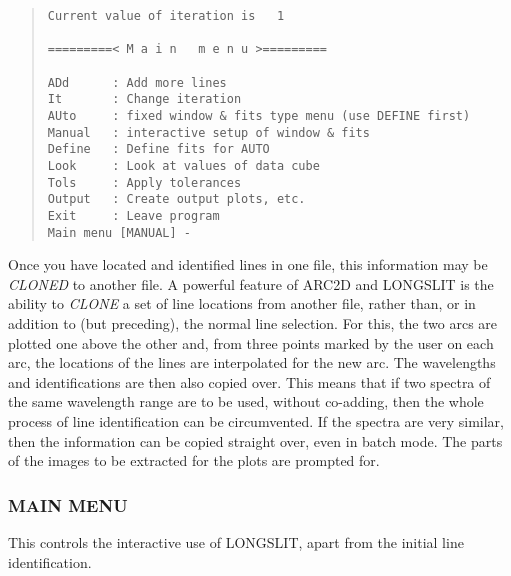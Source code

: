 \begin{quote}\begin{verbatim}
Current value of iteration is   1
 
=========< M a i n   m e n u >=========
 
ADd      : Add more lines
It       : Change iteration
AUto     : fixed window & fits type menu (use DEFINE first)
Manual   : interactive setup of window & fits
Define   : Define fits for AUTO
Look     : Look at values of data cube
Tols     : Apply tolerances
Output   : Create output plots, etc.
Exit     : Leave program
Main menu [MANUAL] -
\end{verbatim}\end{quote}

Once you have located and identified lines in one file, this information
may be {\em CLONED} to another file.
A powerful feature of ARC2D and LONGSLIT
is the ability to {\em CLONE} a set of line locations from another
file, rather than, or in addition to (but preceding), the normal line
selection. For this, the two arcs are plotted one above the other
and, from three points marked by the user on each
arc, the locations of the lines are interpolated for the new arc. The
wavelengths and identifications are then also copied over. This means
that if two spectra of the same wavelength range are to be used,
without co-adding, then the whole process of line identification can be
circumvented. If the spectra are very similar, then the information can
be copied straight over, even in batch mode.
The parts of the images to be extracted for the plots are prompted for.

\subsubsection{MAIN MENU}
\label{long.main}

This controls the interactive use of LONGSLIT, apart from the initial
line identification.

